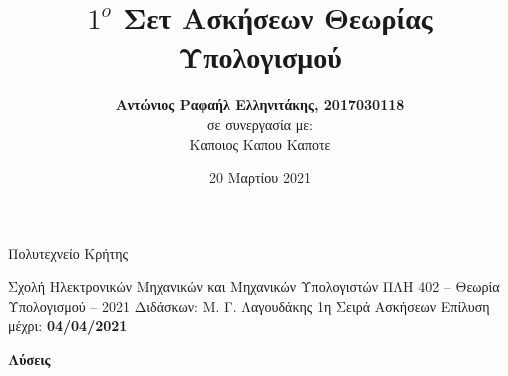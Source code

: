 \documentclass[10pt,a4paper]{article}
\title{\textbf{$1^o$ Σετ Ασκήσεων Θεωρίας Υπολογισμού \\  }}
\author{\textbf{Αντώνιος Ραφαήλ Ελληνιτάκης, 2017030118} \\
σε συνεργασία με: \\
Καποιος Καπου Καποτε}
\date{20 Μαρτίου 2021}
\newcommand{\sol}[1]{#1} %
\begin{document}
	
\maketitle

\newpage
	
\opening
{Πολυτεχνείο Κρήτης}
{Σχολή Ηλεκτρονικών Μηχανικών και Μηχανικών Υπολογιστών}
{ΠΛΗ 402 -- Θεωρία Υπολογισμού -- 2021} %
{Διδάσκων: Μ. Γ. Λαγουδάκης}
{1η Σειρά Ασκήσεων}
{Επίλυση μέχρι: \textbf{04/04/2021}} \vspace{-5ex}

\sol{
\begin{center}
\huge\bf Λύσεις
\end{center}
\vspace*{-0,5cm}
}

\noindent
\end{document}

